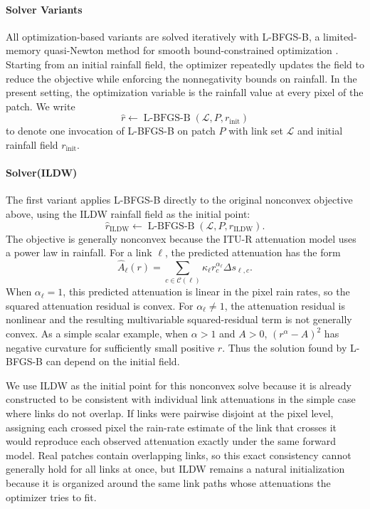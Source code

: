 \documentclass[11pt]{article}
\begin{document}
\paragraph*{Solver Variants}
All optimization-based variants are solved iteratively with L-BFGS-B, a limited-memory quasi-Newton method for smooth bound-constrained optimization \citep{byrd1995limited,zhu1997algorithm}. Starting from an initial rainfall field, the optimizer repeatedly updates the field to reduce the objective while enforcing the nonnegativity bounds on rainfall. In the present setting, the optimization variable is the rainfall value at every pixel of the patch. We write
\[
\hat r \leftarrow \operatorname{L\mbox{-}BFGS\mbox{-}B}(\mathcal{L},P,r_{\mathrm{init}})
\]
to denote one invocation of L-BFGS-B on patch $P$ with link set $\mathcal{L}$ and initial rainfall field $r_{\mathrm{init}}$.

\paragraph*{Solver(ILDW)}
The first variant applies L-BFGS-B directly to the original nonconvex objective above, using the ILDW rainfall field as the initial point:
\[
\hat r_{\mathrm{ILDW}} \leftarrow
\operatorname{L\mbox{-}BFGS\mbox{-}B}(\mathcal{L},P,r_{\mathrm{ILDW}}).
\]
The objective is generally nonconvex because the ITU-R attenuation model uses a power law in rainfall. For a link $\ell$, the predicted attenuation has the form
\[
\widehat A_\ell(r)=\sum_{c\in\mathcal{C}(\ell)}\kappa_\ell r_c^{\alpha_\ell}\Delta s_{\ell,c}.
\]
When $\alpha_\ell=1$, this predicted attenuation is linear in the pixel rain rates, so the squared attenuation residual is convex. {\color{black}For $\alpha_\ell\ne 1$, the attenuation residual is nonlinear and the resulting multivariable squared-residual term is not generally convex. As a simple scalar example, when $\alpha>1$ and $A>0$, $(r^\alpha-A)^2$ has negative curvature for sufficiently small positive $r$.} Thus the solution found by L-BFGS-B can depend on the initial field.

We use ILDW as the initial point for this nonconvex solve because it is already constructed to be consistent with individual link attenuations in the simple case where links do not overlap. If links were pairwise disjoint at the pixel level, assigning each crossed pixel the rain-rate estimate of the link that crosses it would reproduce each observed attenuation exactly under the same forward model. Real patches contain overlapping links, so this exact consistency cannot generally hold for all links at once, but ILDW remains a natural initialization because it is organized around the same link paths whose attenuations the optimizer tries to fit.
\end{document}
